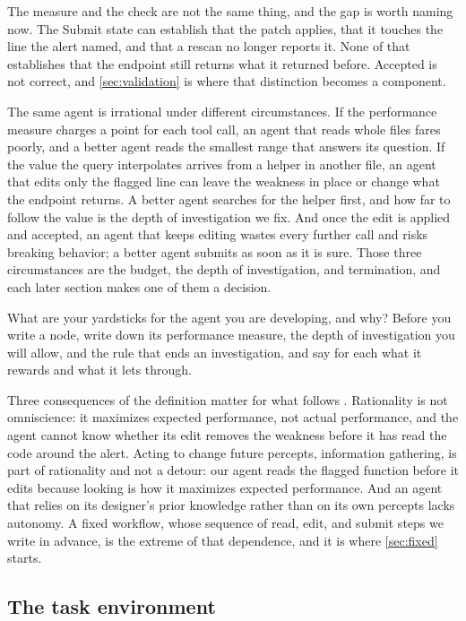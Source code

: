 The measure and the check are not the same thing, and the gap is worth naming now. The Submit
state can establish that the patch applies, that it touches the line the alert named, and that a
rescan no longer reports it. None of that establishes that the endpoint still returns what it
returned before. Accepted is not correct, and \cref{sec:validation} is where that distinction
becomes a component.

The same agent is irrational under different circumstances. If the performance measure charges
a point for each tool call, an agent that reads whole files fares poorly, and a better agent
reads the smallest range that answers its question. If the value the query interpolates arrives
from a helper in another file, an agent that edits only the flagged line can leave the weakness
in place or change what the endpoint returns. A better agent searches for the helper first, and
how far to follow the value is the depth of investigation we fix. And once the edit is applied
and accepted, an agent that keeps editing wastes every further call and risks breaking
behavior; a better agent submits as soon as it is sure. Those three circumstances are the
budget, the depth of investigation, and termination, and each later section makes one of them a
decision.

\begin{foodforthought}
What are your yardsticks for the agent you are developing, and why? Before you write a node,
write down its performance measure, the depth of investigation you will allow, and the rule
that ends an investigation, and say for each what it rewards and what it lets through.
\end{foodforthought}

Three consequences of the definition matter for what follows \citep[\S2.2.3]{russell2020aima}.
Rationality is not omniscience: it maximizes expected performance, not actual performance, and
the agent cannot know whether its edit removes the weakness before it has read the code around
the alert. Acting to change future percepts, information gathering, is part of rationality and
not a detour: our agent reads the flagged function before it edits because looking is how it
maximizes expected performance. And an agent that relies on its designer's prior knowledge
rather than on its own percepts lacks autonomy. A fixed workflow, whose sequence of read, edit,
and submit steps we write in advance, is the extreme of that dependence, and it is where
\cref{sec:fixed} starts.

\subsection{The task environment}
\label{sec:agents-environment}

